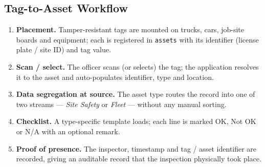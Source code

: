\documentclass[11pt]{article}
\begin{document}
\subsection{Tag-to-Asset Workflow}
\begin{enumerate}[leftmargin=1.4em]
  \item \textbf{Placement.} Tamper-resistant tags are mounted on trucks, cars, job-site boards and
        equipment; each is registered in \texttt{assets} with its identifier (license plate / site ID)
        and tag value.
  \item \textbf{Scan / select.} The officer scans (or selects) the tag; the application resolves it to
        the asset and auto-populates identifier, type and location.
  \item \textbf{Data segregation at source.} The asset type routes the record into one of two streams
        --- \emph{Site Safety} or \emph{Fleet} --- without any manual sorting.
  \item \textbf{Checklist.} A type-specific template loads; each line is marked OK, Not OK or N/A with
        an optional remark.
  \item \textbf{Proof of presence.} The inspector, timestamp and tag / asset identifier are recorded,
        giving an auditable record that the inspection physically took place.
\end{enumerate}
\end{document}
